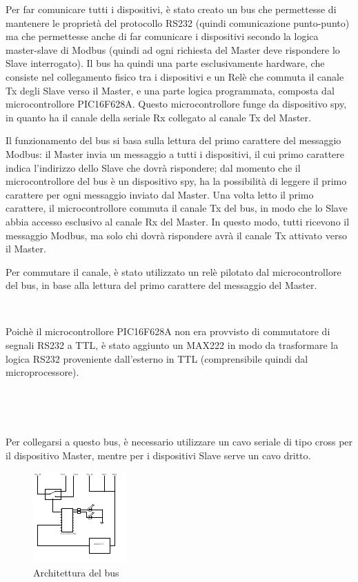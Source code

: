 \documentclass[a4paper,titlepage]{book}
\begin{document}
Per far comunicare tutti i dispositivi, è stato creato un bus che permettesse di mantenere le proprietà del protocollo RS232 (quindi comunicazione punto-punto) ma che permettesse anche di far comunicare i dispositivi secondo la logica master-slave di Modbus (quindi ad ogni richiesta del Master deve rispondere lo Slave interrogato). Il bus ha quindi una parte esclusivamente hardware, che consiste nel collegamento fisico tra i dispositivi e un Relè che commuta il canale Tx degli Slave verso il Master, e una parte logica programmata, composta dal microcontrollore PIC16F628A. Questo microcontrollore funge da dispositivo spy, in quanto ha il canale della seriale Rx collegato al canale Tx del Master.

Il funzionamento del bus si basa sulla lettura del primo carattere del messaggio Modbus: il Master invia un messaggio a tutti i dispositivi, il cui primo carattere indica l'indirizzo dello Slave che dovrà rispondere; dal momento che il microcontrollore del bus è un dispositivo spy, ha la possibilità di leggere il primo carattere per ogni messaggio inviato dal Master. Una volta letto il primo carattere, il microcontrollore commuta il canale Tx del bus, in modo che lo Slave abbia accesso esclusivo al canale Rx del Master. In questo modo, tutti ricevono il messaggio Modbus, ma solo chi dovrà rispondere avrà il canale Tx attivato verso il Master.

Per commutare il canale, è stato utilizzato un relè pilotato dal microcontrollore del bus, in base alla lettura del primo carattere del messaggio del Master.

~

Poichè il microcontrollore PIC16F628A non era provvisto di commutatore di segnali RS232 a TTL, è stato aggiunto un MAX222 in modo da trasformare la logica RS232 proveniente dall'esterno in TTL (comprensibile quindi dal microprocessore).

~

~

Per collegarsi a questo bus, è necessario utilizzare un cavo seriale di tipo cross per il dispositivo Master, mentre per i dispositivi Slave serve un cavo dritto.


\begin{figure}[!h]
\centering
\includegraphics[scale=4.5]{bus.pdf}
\caption{Architettura del bus}
\end{figure}
\end{document}
